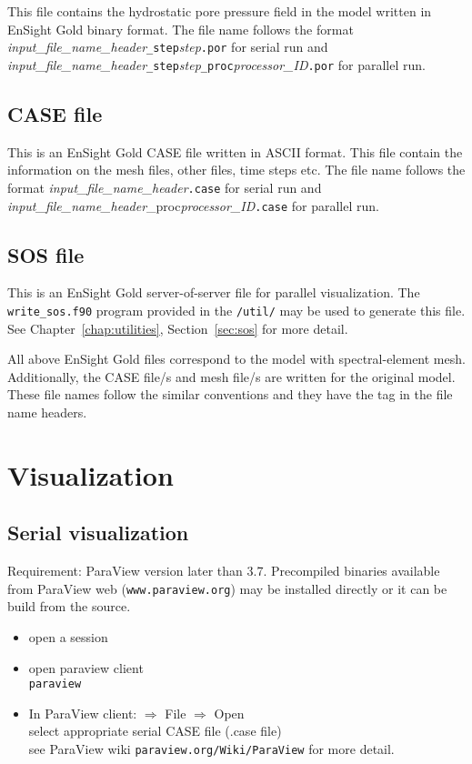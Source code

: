 This file contains the hydrostatic pore pressure field in the model written in EnSight Gold binary format. The file name follows the format \emph{input\_file\_name\_header}\texttt{\_step}\emph{step}\texttt{.por} for serial run and \emph{input\_file\_name\_header}\texttt{\_step}\emph{step}\texttt{\_proc}\emph{processor\_ID}\texttt{.por} for parallel run.

\subsection{CASE file}

This is an EnSight Gold CASE file written in ASCII format. This file contain the information on the mesh files, other files, time steps etc. The file name follows the format \emph{input\_file\_name\_header}\texttt{.case} for serial run and \emph{input\_file\_name\_header}{\_proc}\emph{processor\_ID}\texttt{.case} for parallel run.

\subsection{SOS file}

This is an EnSight Gold server-of-server file for parallel visualization. The \texttt{write\_sos.f90} program provided in the \texttt{/util/} may be used to generate this file. See Chapter~\ref{chap:utilities}, Section~\ref{sec:sos} for more detail.

All above EnSight Gold files correspond to the model with spectral-element mesh. Additionally, the CASE file/s and mesh file/s are written for the original model. These file names follow the similar conventions and they have the tag \texttt{} in the file name headers.

\section{Visualization}
\subsection{Serial visualization}

Requirement: ParaView version later than 3.7. Precompiled binaries available from ParaView web (\texttt{www.paraview.org}) may be installed directly or it can be build from the source.

\begin{itemize}
\item open a session
\item open paraview client \\
\texttt{paraview}
\item In ParaView client: $\Rightarrow$ File $\Rightarrow$ Open\\
   select appropriate serial CASE file (.case file)\\
   see ParaView wiki \texttt{paraview.org/Wiki/ParaView} for more detail.
\end{itemize}

